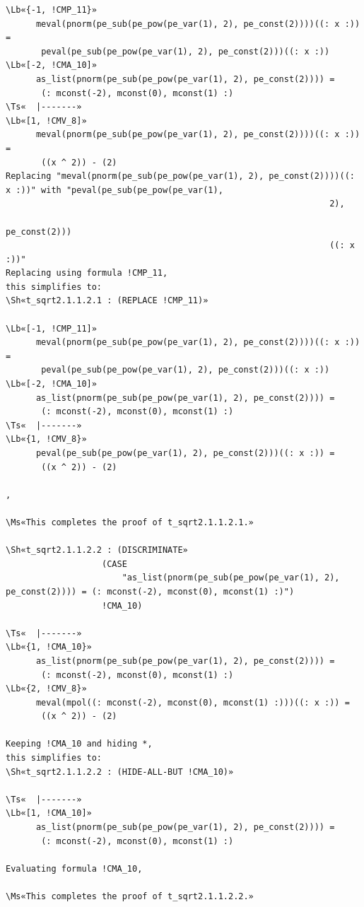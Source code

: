 \documentclass[11pt]{article}
\newcommand\Ms[1]{\textcolor{moss}{\textbf{#1}}}
\newcommand\Lb[1]{\textcolor{muted}{#1}}
\newcommand\Ts[1]{\textcolor{muted}{#1}}
\newcommand\Sh[1]{\textcolor{accent}{#1}}
\begin{document}
\begin{enumerate}[leftmargin=1.4em, itemsep=10pt, label=\textbf{\textcolor{accent}{\arabic*}}]
\begin{termbox}
\begin{Verbatim}[commandchars=\\«»]
\Lb«{-1, !CMP_11}»
      meval(pnorm(pe_sub(pe_pow(pe_var(1), 2), pe_const(2))))((: x :)) =
       peval(pe_sub(pe_pow(pe_var(1), 2), pe_const(2)))((: x :))
\Lb«[-2, !CMA_10]»
      as_list(pnorm(pe_sub(pe_pow(pe_var(1), 2), pe_const(2)))) =
       (: mconst(-2), mconst(0), mconst(1) :)
\Ts«  |-------»
\Lb«[1, !CMV_8]»
      meval(pnorm(pe_sub(pe_pow(pe_var(1), 2), pe_const(2))))((: x :)) =
       ((x ^ 2)) - (2)
Replacing "meval(pnorm(pe_sub(pe_pow(pe_var(1), 2), pe_const(2))))((: x :))" with "peval(pe_sub(pe_pow(pe_var(1),
                                                                2),
                                                                pe_const(2)))
                                                                ((: x :))"
Replacing using formula !CMP_11,
this simplifies to:
\Sh«t_sqrt2.1.1.2.1 : (REPLACE !CMP_11)»

\Lb«[-1, !CMP_11]»
      meval(pnorm(pe_sub(pe_pow(pe_var(1), 2), pe_const(2))))((: x :)) =
       peval(pe_sub(pe_pow(pe_var(1), 2), pe_const(2)))((: x :))
\Lb«[-2, !CMA_10]»
      as_list(pnorm(pe_sub(pe_pow(pe_var(1), 2), pe_const(2)))) =
       (: mconst(-2), mconst(0), mconst(1) :)
\Ts«  |-------»
\Lb«{1, !CMV_8}»
      peval(pe_sub(pe_pow(pe_var(1), 2), pe_const(2)))((: x :)) =
       ((x ^ 2)) - (2)

,

\Ms«This completes the proof of t_sqrt2.1.1.2.1.»

\Sh«t_sqrt2.1.1.2.2 : (DISCRIMINATE»
                   (CASE
                       "as_list(pnorm(pe_sub(pe_pow(pe_var(1), 2), pe_const(2)))) = (: mconst(-2), mconst(0), mconst(1) :)")
                   !CMA_10)

\Ts«  |-------»
\Lb«{1, !CMA_10}»
      as_list(pnorm(pe_sub(pe_pow(pe_var(1), 2), pe_const(2)))) =
       (: mconst(-2), mconst(0), mconst(1) :)
\Lb«{2, !CMV_8}»
      meval(mpol((: mconst(-2), mconst(0), mconst(1) :)))((: x :)) =
       ((x ^ 2)) - (2)

Keeping !CMA_10 and hiding *,
this simplifies to:
\Sh«t_sqrt2.1.1.2.2 : (HIDE-ALL-BUT !CMA_10)»

\Ts«  |-------»
\Lb«[1, !CMA_10]»
      as_list(pnorm(pe_sub(pe_pow(pe_var(1), 2), pe_const(2)))) =
       (: mconst(-2), mconst(0), mconst(1) :)

Evaluating formula !CMA_10,

\Ms«This completes the proof of t_sqrt2.1.1.2.2.»
\end{Verbatim}
\end{termbox}


\end{enumerate}
\end{document}
